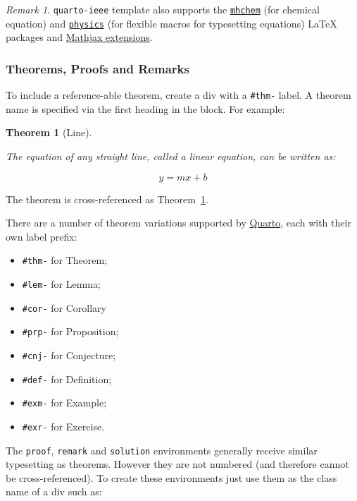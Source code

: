 \documentclass[
  twoside,
  web,
            journal,
    ]{ieeecolor}
\providecommand{\tightlist}{%
  \setlength{\itemsep}{0pt}\setlength{\parskip}{0pt}}
\theoremstyle{plain}
\newtheorem{theorem}{Theorem}[section]
\theoremstyle{remark}
\newtheorem*{remark}{Remark}
\begin{document}
\begin{remark}
\texttt{quarto-ieee} template also supports the
\href{https://ctan.org/pkg/mhchem}{\texttt{mhchem}} (for chemical
equation) and \href{https://ctan.org/pkg/physics}{\texttt{physics}} (for
flexible macros for typesetting equations) {\LaTeX} packages and
\href{https://docs.mathjax.org/en/latest/input/tex/extensions/index.html}{Mathjax
extensions}.
\end{remark}

\subsubsection{Theorems, Proofs and
Remarks}\label{theorems-proofs-and-remarks}

To include a reference-able theorem, create a div with a \texttt{\#thm-}
label. A theorem name is specified via the first heading in the block.
For example:

\begin{theorem}[Line]\protect\hypertarget{thm-line}{}\label{thm-line}

The equation of any straight line, called a linear equation, can be
written as:

\[
y = mx + b
\]

\end{theorem}

The theorem is cross-referenced as Theorem~\ref{thm-line}.

There are a number of theorem variations supported by
\href{https://quarto.org/docs/authoring/cross-references.html\#theorems-and-proofs}{Quarto},
each with their own label prefix:

\begin{itemize}
\tightlist
\item
  \texttt{\#thm-} for Theorem;
\item
  \texttt{\#lem-} for Lemma;
\item
  \texttt{\#cor-} for Corollary
\item
  \texttt{\#prp-} for Proposition;
\item
  \texttt{\#cnj-} for Conjecture;
\item
  \texttt{\#def-} for Definition;
\item
  \texttt{\#exm-} for Example;
\item
  \texttt{\#exr-} for Exercise.
\end{itemize}

The \texttt{proof}, \texttt{remark} and \texttt{solution} environments
generally receive similar typesetting as theorems. However they are not
numbered (and therefore cannot be cross-referenced). To create these
environments just use them as the class name of a div such as:
\end{document}

